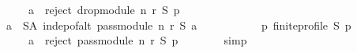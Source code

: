 \begin{isabellebody}
\ \ \ \ \ \ \ \ \ \ \ \ a\ {\isasymin}\ reject\ {\isacharparenleft}{\kern0pt}drop{\isacharunderscore}{\kern0pt}module\ n\ r{\isacharparenright}{\kern0pt}\ S\ p{\isacharparenright}{\kern0pt}{\isacharparenright}{\kern0pt}\ {\isasymand}\isanewline
\ \ \ \ \ \ \ \ {\isacharparenleft}{\kern0pt}{\isasymforall}a\ {\isasymin}\ S{\isacharminus}{\kern0pt}{\isacharquery}{\kern0pt}A{\isachardot}{\kern0pt}\ indep{\isacharunderscore}{\kern0pt}of{\isacharunderscore}{\kern0pt}alt\ {\isacharparenleft}{\kern0pt}pass{\isacharunderscore}{\kern0pt}module\ n\ r{\isacharparenright}{\kern0pt}\ S\ a\ {\isasymand}\isanewline
\ \ \ \ \ \ \ \ \ \ {\isacharparenleft}{\kern0pt}{\isasymforall}p{\isachardot}{\kern0pt}\ finite{\isacharunderscore}{\kern0pt}profile\ S\ p\ {\isasymlongrightarrow}\isanewline
\ \ \ \ \ \ \ \ \ \ \ \ a\ {\isasymin}\ reject\ {\isacharparenleft}{\kern0pt}pass{\isacharunderscore}{\kern0pt}module\ n\ r{\isacharparenright}{\kern0pt}\ S\ p{\isacharparenright}{\kern0pt}{\isacharparenright}{\kern0pt}{\isachardoublequoteclose}\isanewline
\ \ \ \ \ \ \isamarkupfalse%
\ simp\isanewline
\ \ \isamarkupfalse%
\isanewline
{}\isamarkupfalse%
%
\endisatagproof
{\isafoldproof}%
%
\isadelimproof
\isanewline
%
\endisadelimproof
%
\isadelimtheory
\isanewline
%
\endisadelimtheory
%
\isatagtheory
{}\isamarkupfalse%
%
\endisatagtheory
{\isafoldtheory}%
%
\isadelimtheory
%
\endisadelimtheory
%
\end{isabellebody}%
\endinput
